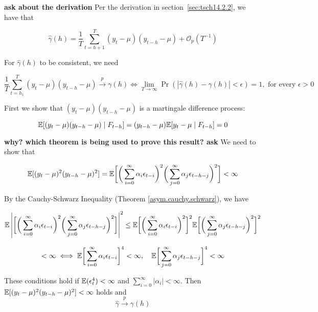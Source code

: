 \begin{enumerate}[(a)]

 \textbf{ask about the derivation}  Per the derivation in section~\ref{sec:tsch14.2.2}, we have that

%

\[
\hat{\gamma}(h)  = \frac{1}{T} \sum_{t=h+1}^T(y_t - \mu)(y_{t-h} - \mu) + \mathcal{O}_p(T^{-1})
\]

For \(\hat{\gamma}(h)\) to be consistent, we need

\[
\frac{1}{T}\sum_{t=h_1}^T (y_t - \mu)(y_{t-h} - \mu) \xrightarrow{p} \gamma(h) \iff \lim_{T \to \infty} \Pr(|\hat{\gamma}(h)-\gamma(h)| < \epsilon) = 1, \text{ for every } \epsilon > 0
\]

First we show that \((y_t - \mu)(y_{t-h} - \mu)\) is a martingale difference process:

\[
\mathbb{E}[(y_t - \mu)(y_{t-h} - \mu) \mid F_{t-h}] =(y_{t-h} - \mu)  \mathbb{E}[y_t - \mu \mid F_{t-h}] = 0
\]

\textbf{why? which theorem is being used to prove this result? ask} We need to show that

\[
\mathbb{E}[(y_t - \mu)^2(y_{t-h} - \mu)^2 ] = \mathbb{E} \bigg[ \bigg( \sum_{i=0}^\infty \alpha_i \epsilon_{t-i} \bigg)^2 \bigg( \sum_{j=0}^\infty \alpha_j \epsilon_{t - h - j} \bigg) ^2 \bigg] < \infty
\]

By the Cauchy-Schwarz Inequality (Theorem \ref{asym.cauchy.schwarz}), we have

\[
\mathbb{E} \left| \bigg[ \bigg( \sum_{i=0}^\infty \alpha_i \epsilon_{t-i} \bigg)^2 \bigg( \sum_{j=0}^\infty \alpha_j \epsilon_{t - h - j} \bigg) ^2 \bigg] \right| ^2 \leq \mathbb{E} \bigg[ \bigg( \sum_{i=0}^\infty \alpha_i \epsilon_{t-i} \bigg)^2\bigg]^2 \mathbb{E} \bigg[ \bigg( \sum_{j=0}^\infty \alpha_j \epsilon_{t - h - j} \bigg) ^2\bigg]^2
\]

\[
< \infty \iff \mathbb{E} \bigg[ \sum_{i=0}^\infty \alpha_i \epsilon_{t-i}\bigg]^4 < \infty, \ \ \  \mathbb{E} \bigg[ \sum_{j=0}^\infty \alpha_j \epsilon_{t - h - j} \bigg]^4 < \infty
\]

These conditions hold if \(\mathbb{E}(\epsilon_t^4) < \infty\) and \(\sum_{i=0}^\infty |\alpha_i| < \infty\). Then \(\mathbb{E}[(y_t - \mu)^2(y_{t-h} - \mu)^2 ] < \infty\) holds and
\[
\hat{\gamma} \xrightarrow{p} \gamma(h)
\]

\end{enumerate}

